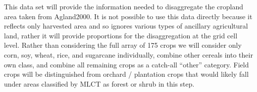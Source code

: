 \citet{Monfreda2008}




This data set will provide the information needed to disaggregate the
cropland area taken from Agland2000.  It is not possible to use this
data directly because it reflects only harvested area and so ignores
various types of ancillary agricultural land, rather it will provide
proportions for the disaggregation at the grid cell level.  Rather
than considering the full array of 175 crops we will consider only
corn, soy, wheat, rice, and sugarcane individually, combine other
cereals into their own class, and combine all remaining crops as a
catch-all ``other'' category.  Field crops will be distinguished from
orchard / plantation crops that would likely fall under areas
classified by MLCT as forest or shrub in this step.


